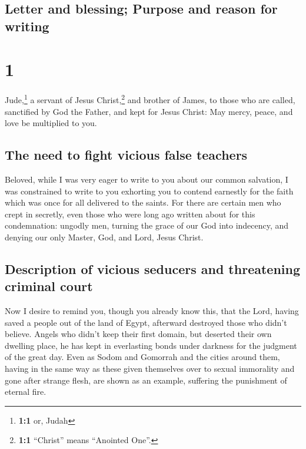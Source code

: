 \hypertarget{letter-and-blessing-purpose-and-reason-for-writing}{%
\subsection{Letter and blessing; Purpose and reason for
writing}\label{letter-and-blessing-purpose-and-reason-for-writing}}

\hypertarget{section}{%
\section{1}\label{section}}

 Jude,\footnote{\textbf{1:1} or, Judah} a servant of Jesus
Christ,\footnote{\textbf{1:1} ``Christ'' means ``Anointed One''.} and
brother of James, to those who are called, sanctified by God the Father,
and kept for Jesus Christ:  May mercy, peace, and love be
multiplied to you.

\hypertarget{the-need-to-fight-vicious-false-teachers}{%
\subsection{The need to fight vicious false
teachers}\label{the-need-to-fight-vicious-false-teachers}}

 Beloved, while I was very eager to write to you about our
common salvation, I was constrained to write to you exhorting you to
contend earnestly for the faith which was once for all delivered to the
saints.  For there are certain men who crept in secretly,
even those who were long ago written about for this condemnation:
ungodly men, turning the grace of our God into indecency, and denying
our only Master, God, and Lord, Jesus Christ.

\hypertarget{description-of-vicious-seducers-and-threatening-criminal-court}{%
\subsection{Description of vicious seducers and threatening criminal
court}\label{description-of-vicious-seducers-and-threatening-criminal-court}}

 Now I desire to remind you, though you already know this,
that the Lord, having saved a people out of the land of Egypt, afterward
destroyed those who didn't believe.  Angels who didn't
keep their first domain, but deserted their own dwelling place, he has
kept in everlasting bonds under darkness for the judgment of the great
day.  Even as Sodom and Gomorrah and the cities around
them, having in the same way as these given themselves over to sexual
immorality and gone after strange flesh, are shown as an example,
suffering the punishment of eternal fire.

